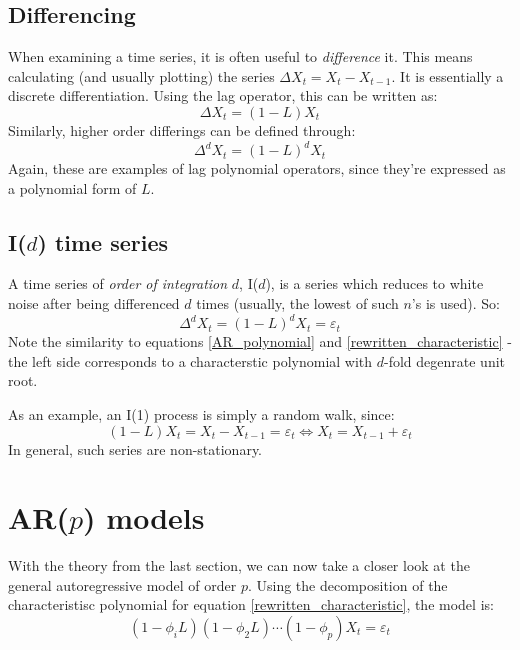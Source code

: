 \documentclass[12pt, a4paper]{article}
\numberwithin{equation}{section}
\begin{document}
\subsection{Differencing}
When examining a time series, it is often useful to \textit{difference} it. This means calculating (and usually plotting) the series $\Delta X_t=X_t-X_{t-1}$. It is essentially a discrete differentiation. Using the lag operator, this can be written as:
\begin{equation}
\Delta X_t=(1-L)X_t
\end{equation}
Similarly, higher order differings can be defined through:
\begin{equation}
\Delta^d X_t=(1-L)^d X_t
\end{equation}
Again, these are examples of lag polynomial operators, since they're expressed as a polynomial form of $L$.

\subsection{I($d$) time series}
A time series of \textit{order of integration} $d$, I($d$), is a series which reduces to white noise after being differenced $d$ times (usually, the lowest of such $n$'s is used). So:
\begin{equation}
\Delta^d X_t=(1-L)^d X_t=\varepsilon_t
\end{equation}
Note the similarity to equations \ref{AR_polynomial} and \ref{rewritten_characteristic} - the left side corresponds to a characterstic polynomial with $d$-fold degenrate unit root.

As an example, an I(1) process is simply a random walk, since:
\begin{equation}
(1-L)X_t=X_t-X_{t-1}=\varepsilon_t\Leftrightarrow X_t=X_{t-1}+\varepsilon_t
\end{equation}
In general, such series are non-stationary.

\section{AR($p$) models}
With the theory from the last section, we can now take a closer look at the general autoregressive model of order $p$. Using the decomposition of the characteristisc polynomial for equation \ref{rewritten_characteristic}, the model is:
\begin{equation}
(1-\phi_i L)(1-\phi_2 L)\cdots(1-\phi_p)X_t=\varepsilon_t
\end{equation}
\end{document}
